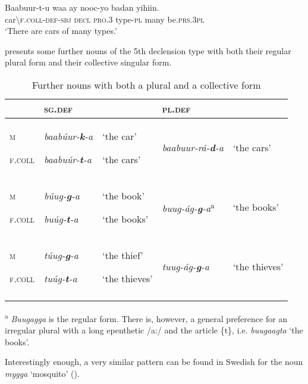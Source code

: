\documentclass[output=paper]{langsci/langscibook}
\begin{document}
\ea
\gll Baabuur-t-u     waa    ay    nooc-yo  badan   yihiin.\\
     car{\textbackslash}\textsc{f.coll-def-sbj}  \textsc{decl}   \textsc{pro.3}  type-\textsc{pl}  many   be.\textsc{prs.3pl}\\
\glt ‘There are cars of many types.’
\z

 presents some further nouns of the 5th declension type with both their regular plural form and their collective singular form.
 
\begin{table}
\caption{Further nouns with both a plural and a collective form}
\label{tab:10}
\begin{tabularx}{\textwidth}{XXXlX} 
\lsptoprule
& {\textsc{sg.def}} &  & {\textsc{pl.def}} & \\
\midrule
{\textsc{m}}

{\textsc{f.coll}} & {\textit{baabúur-}\textbf{\textit{k}}\textit{-a}}

{\textit{baabuúr-}\textbf{\textit{t}}\textit{-a}} & {‘the car’}

{‘the cars’} & {\textit{baabuur-rá-}\textbf{\textit{d}}\textit{-a}} & {‘the cars’}\\
\tablevspace
{\textsc{m}}

{\textsc{f.coll}} & {\textit{búug-}\textbf{\textit{g}}\textit{-a}}

{\textit{buúg-}\textbf{\textit{t}}\textit{-a}} & {‘the book’}

{‘the books’} & {\textit{buug-ág-}\textbf{\textit{g}}\textit{-a}\textsuperscript{a}} & {‘the books’}\\
\tablevspace
{\textsc{m}}

{\textsc{f.coll}} & {\textit{túug-}\textbf{\textit{g}}\textit{-a}}

{\textit{tuúg-}\textbf{\textit{t}}\textit{-a}} & {‘the thief’}

{‘the thieves’} & {\textit{tuug-ág-}\textbf{\textit{g}}\textit{-a}} & {‘the thieves’}\\
\lspbottomrule
\end{tabularx}

\end{table} 

\textsuperscript{a} \textit{Buugagga} is the regular form. There is, however, a general preference for an irregular plural with a long epenthetic /a:/ and the article \{t\}, i.e. \textit{buugaagta} ‘the books’.

Interestingly enough, a very similar pattern can be found in Swedish for the noun \textit{mygga} ‘mosquito’ ().\textit{} 
\end{document}
